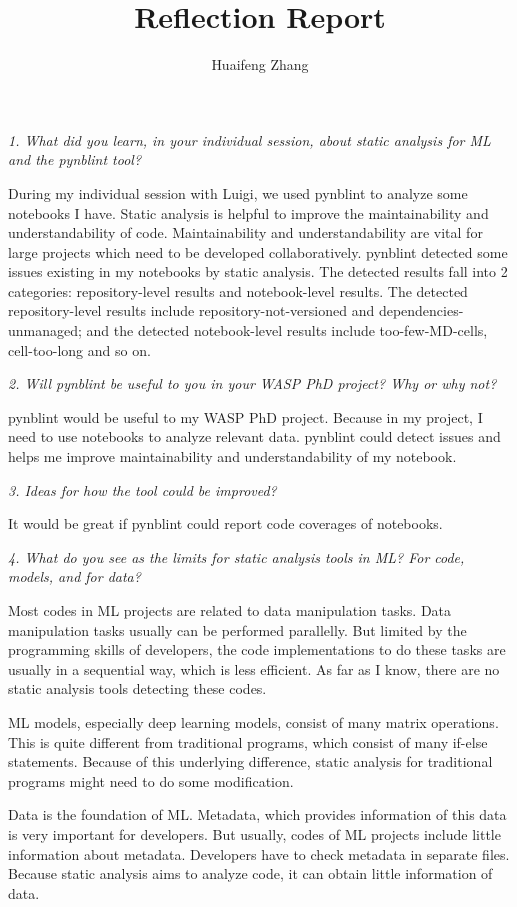 \documentclass[12pt, a4paper]{article}
\title{Reflection Report}
\author{Huaifeng Zhang}
\date{}
\begin{document}
\maketitle
 

\begin{center}
    \textit{1. What did you learn, in your individual session, about static analysis for ML and the pynblint tool?}    
\end{center}

During my individual session with Luigi, we used \textsf{pynblint} to analyze some notebooks I have. 
Static analysis is helpful to improve the maintainability and understandability of code. 
Maintainability and understandability are vital for large projects which need to be developed collaboratively.
\textsf{pynblint} detected some issues existing in my notebooks by static analysis. The detected results 
fall into 2 categories: repository-level results and notebook-level results. The detected repository-level results include
\textsf{repository-not-versioned} and \textsf{dependencies-unmanaged}; and the detected notebook-level results include
\textsf{too-few-MD-cells}, \textsf{cell-too-long} and so on.

\begin{center}
    \textit{2. Will pynblint be useful to you in your WASP PhD project? Why or why not?}    
\end{center}
\textsf{pynblint} would be useful to my WASP PhD project. Because in my project, I need
to use notebooks to analyze relevant data. \textsf{pynblint} could detect issues and helps me 
improve maintainability and understandability of my notebook.


\begin{center}
    \textit{3. Ideas for how the tool could be improved?}    
\end{center}
It would be great if \textsf{pynblint} could report code coverages of notebooks.

\begin{center}
    \textit{4. What do you see as the limits for static analysis tools in ML? For code, models, and for data?}    
\end{center}
Most codes in ML projects are related to data manipulation tasks. 
Data manipulation tasks usually can be performed parallelly.
But limited by the programming skills of developers, 
the code implementations to do these tasks are usually in a sequential way, 
which is less efficient. 
As far as I know, there are no static analysis tools detecting these codes. 

ML models, especially deep learning models, consist of many matrix operations.
This is quite different from traditional programs, which consist of many if-else statements.
Because of this underlying difference, 
static analysis for traditional programs might need to do some modification.

Data is the foundation of ML. 
Metadata, which provides information of this data is very important for developers.
But usually, codes of ML projects include little information about metadata. 
Developers have to check metadata in separate files. 
Because static analysis aims to analyze code, it can obtain little information of data.
\end{document}
